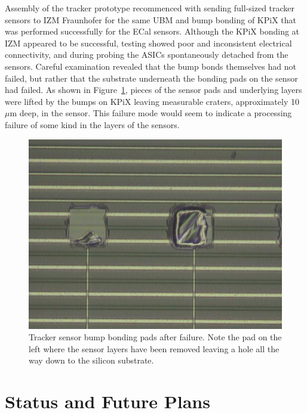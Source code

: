 \documentclass[prc,12pt,nofootinbib,letterpaper]{revtex4}
\begin{document}
Assembly of the tracker prototype recommenced with sending full-sized tracker sensors to IZM Fraunhofer for the same UBM and bump bonding of KPiX that was performed successfully for the ECal sensors.  Although the KPiX bonding at IZM appeared to be successful, testing showed poor and inconsistent electrical connectivity, and during probing the ASICs spontaneously detached from the sensors. Careful examination revealed that the bump bonds themselves had not failed, but rather that the substrate underneath the bonding pads on the sensor had failed.  As shown in Figure~\ref{fig:kpix_bump}, pieces of the sensor pads and underlying layers were lifted by the bumps on KPiX leaving measurable craters, approximately 10 $\mu$m deep, in the sensor. This failure mode would seem to indicate a processing failure of some kind in the layers of the sensors.
\begin{figure}[htb]
\begin{center}
    \includegraphics[width=5in]{figures/Kpix_Bump8}
\caption{Tracker sensor bump bonding pads after failure. Note the pad on the left where the sensor layers have been removed leaving a hole all the way down to the silicon substrate.}
\label{fig:kpix_bump}
\end{center}
\end{figure}

\section{Status and Future Plans}
\end{document}
